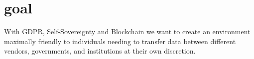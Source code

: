 \section{goal}
With GDPR, Self-Sovereignty and Blockchain we want to create an environment maximally friendly to individuals needing to transfer data between different vendors, governments, and institutions at their own discretion.	
	



